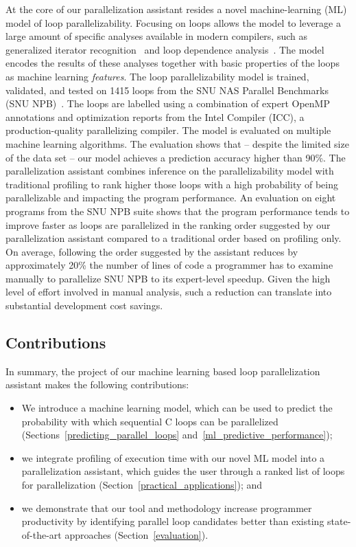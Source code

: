 
At the core of our parallelization assistant resides a novel machine-learning (ML) model of loop parallelizability.
%
Focusing on loops allows the model to leverage a large amount of specific analyses available in modern compilers, such as generalized iterator recognition~\cite{Manilov:2018:GPI:3178372.3179511} and loop dependence analysis~\cite{Jensen:2017:ILD:3132652.3095754}.
%
The model encodes the results of these analyses together with basic properties of the loops as machine learning \textit{features}.
%
The loop parallelizability model is trained, validated, and tested on 1415 loops
from the SNU NAS Parallel Benchmarks (SNU
NPB)~\cite{Seo:2011:PCN:2357490.2358063}.
%
The loops are labelled using a combination of expert OpenMP~\cite{Dagum:1998:OIA:615255.615542}
annotations and optimization reports from the Intel \cpp{} Compiler (ICC), a
production-quality parallelizing compiler.
%
The model is evaluated on multiple machine learning algorithms.
%
The evaluation shows that -- despite the limited size of the data set -- our model achieves a prediction accuracy higher than 90\%.
%
\quad The parallelization assistant combines inference on the parallelizability model
with traditional profiling to rank higher those loops with a high probability of being parallelizable and impacting the program performance.
%
An evaluation on eight programs from the SNU NPB suite shows that
the program performance tends to improve faster as loops are parallelized in the ranking order suggested by our parallelization assistant compared to a traditional order based on profiling only.
%
On average, following the order suggested by the assistant reduces by approximately 20\% the number of lines of code a programmer has to examine manually to parallelize SNU NPB to its expert-level speedup.
%
Given the high level of effort involved in manual analysis, such a reduction
can translate into substantial development cost savings.

\subsection{Contributions}
\quad In summary, the project of our machine learning based loop parallelization assistant makes the following contributions:
%
\begin{itemize}
\renewcommand\labelitemi{$\vartriangleright$}
\renewcommand\labelitemii{$\bullet$}
\item We introduce a machine learning model, which can be used to predict the probability with which sequential C loops can be parallelized (Sections~\ref{predicting_parallel_loops} and~\ref{ml_predictive_performance});
\item we integrate profiling of execution time with our novel ML model into a parallelization assistant, which guides the user through a ranked list of loops for parallelization (Section~\ref{practical_applications}); and
\item we demonstrate that our tool and methodology increase programmer productivity by identifying parallel loop candidates better than existing state-of-the-art approaches (Section~\ref{evaluation}).
\end{itemize}


